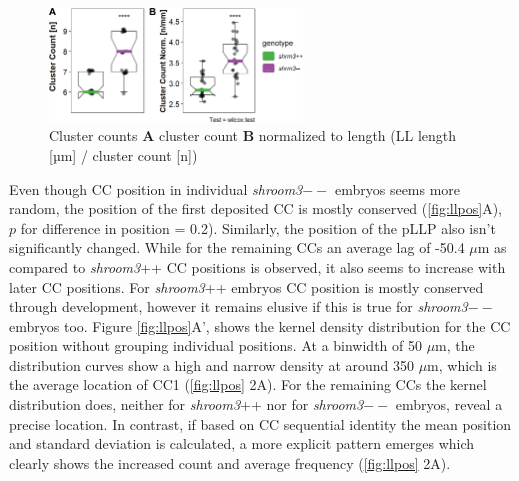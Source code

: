 \documentclass[11pt,singlespacinge,twoside]{reedthesis} %
\begin{document}
\begin{figure}

{\centering \includegraphics[width=0.6\textwidth]{figures/results/01_morphometrics/ll_counts} 

}

\caption[Cluster Counts]{Cluster counts \textbf{A} cluster count \textbf{B} normalized to length (LL length {[}µm{]} / cluster count {[}n{]})}\label{fig:llcounts}
\end{figure}
Even though CC position in individual \emph{shroom3}\(--\) embryos seems more random, the position of the first deposited CC is mostly conserved (\ref{fig:llpos}A), \(p\) for difference in position = 0.2). Similarly, the position of the pLLP also isn't significantly changed. While for the remaining CCs an average lag of -50.4 \(\mu\)m as compared to \emph{shroom3}++ CC positions is observed, it also seems to increase with later CC positions. For \emph{shroom3}++ embryos CC position is mostly conserved through development, however it remains elusive if this is true for \emph{shroom3}\(--\) embryos too.
Figure \ref{fig:llpos}A', shows the kernel density distribution for the CC position without grouping individual positions. At a binwidth of 50 \(\mu\)m, the distribution curves show a high and narrow density at around 350 \(\mu\)m, which is the average location of CC1 (\ref{fig:llpos} 2A). For the remaining CCs the kernel distribution does, neither for \emph{shroom3}++ nor for \emph{shroom3}\(--\) embryos, reveal a precise location. In contrast, if based on CC sequential identity the mean position and standard deviation is calculated, a more explicit pattern emerges which clearly shows the increased count and average frequency (\ref{fig:llpos} 2A).
\end{document}
